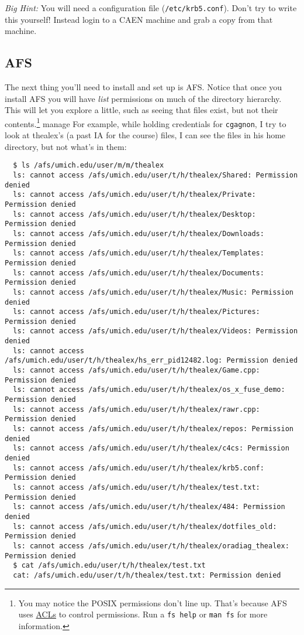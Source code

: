 \documentclass{article}
\begin{document}
\emph{Big Hint:} You will need a configuration file (\texttt{/etc/krb5.conf}).
Don't try to write this yourself! Instead login to a CAEN machine and grab a
copy from that machine.

\subsection*{AFS}

The next thing you'll need to install and set up is AFS.
Notice that once you install AFS you will have \emph{list} permissions on much
of the directory hierarchy. This will let you explore a little, such as seeing
that files exist, but not their contents.\footnote{You may notice the POSIX
permissions don't line up. That's because AFS uses
\href{https://web.njit.edu/info/afs.perms.html}{ACLs} to control permissions.
Run a \texttt{fs help} or \texttt{man fs} for more information. }
manage  For example, while holding credentials for \texttt{cgagnon}, I try to
look at thealex's (a past IA for the course) files, I can see the files in his
home directory, but not what's in them:

\begin{lstlisting}
  $ ls /afs/umich.edu/user/m/m/thealex
  ls: cannot access /afs/umich.edu/user/t/h/thealex/Shared: Permission denied
  ls: cannot access /afs/umich.edu/user/t/h/thealex/Private: Permission denied
  ls: cannot access /afs/umich.edu/user/t/h/thealex/Desktop: Permission denied
  ls: cannot access /afs/umich.edu/user/t/h/thealex/Downloads: Permission denied
  ls: cannot access /afs/umich.edu/user/t/h/thealex/Templates: Permission denied
  ls: cannot access /afs/umich.edu/user/t/h/thealex/Documents: Permission denied
  ls: cannot access /afs/umich.edu/user/t/h/thealex/Music: Permission denied
  ls: cannot access /afs/umich.edu/user/t/h/thealex/Pictures: Permission denied
  ls: cannot access /afs/umich.edu/user/t/h/thealex/Videos: Permission denied
  ls: cannot access /afs/umich.edu/user/t/h/thealex/hs_err_pid12482.log: Permission denied
  ls: cannot access /afs/umich.edu/user/t/h/thealex/Game.cpp: Permission denied
  ls: cannot access /afs/umich.edu/user/t/h/thealex/os_x_fuse_demo: Permission denied
  ls: cannot access /afs/umich.edu/user/t/h/thealex/rawr.cpp: Permission denied
  ls: cannot access /afs/umich.edu/user/t/h/thealex/repos: Permission denied
  ls: cannot access /afs/umich.edu/user/t/h/thealex/c4cs: Permission denied
  ls: cannot access /afs/umich.edu/user/t/h/thealex/krb5.conf: Permission denied
  ls: cannot access /afs/umich.edu/user/t/h/thealex/test.txt: Permission denied
  ls: cannot access /afs/umich.edu/user/t/h/thealex/484: Permission denied
  ls: cannot access /afs/umich.edu/user/t/h/thealex/dotfiles_old: Permission denied
  ls: cannot access /afs/umich.edu/user/t/h/thealex/oradiag_thealex: Permission denied
  $ cat /afs/umich.edu/user/t/h/thealex/test.txt
  cat: /afs/umich.edu/user/t/h/thealex/test.txt: Permission denied
\end{lstlisting}
\end{document}
